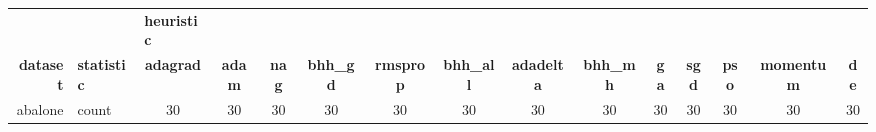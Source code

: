 \begin{table}[htbp]
{\begin{tabular}{rlccc|c|c|c|c|c|ccccc}
			                                                                               &                    & \multicolumn{1}{l}{\textbf{heuristic}}                                         &                                                                                & \multicolumn{1}{r}{}                                                           & \multicolumn{1}{r}{}                            & \multicolumn{1}{r}{}                                                           & \multicolumn{1}{r}{}                            & \multicolumn{1}{r}{}                                                           & \multicolumn{1}{r}{}                            &                                                 &                                                 &                                                 &                                                 &                                                 \\
			\cmidrule{3-3}\cmidrule{6-6}\cmidrule{8-8}\cmidrule{10-10}    \textbf{dataset} & \textbf{statistic} & \textbf{adagrad}                                                               & \textbf{adam}                                                                  & \textbf{nag}                                                                   & \textbf{bhh\_gd}                                & \textbf{rmsprop}                                                               & \textbf{bhh\_all}                               & \textbf{adadelta}                                                              & \textbf{bhh\_mh}                                & \textbf{ga}                                     & \textbf{sgd}                                    & \textbf{pso}                                    & \textbf{momentum}                               & \textbf{de}                                     \\
			\midrule
			abalone                                                                        & count              & 30                                                                             & 30                                                                             & 30                                                                             & 30                                              & 30                                                                             & 30                                              & 30                                                                             & 30                                              & 30                                              & 30                                              & 30                                              & 30                                              & 30                                              \\

\end{tabular}}
\end{table}
